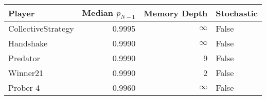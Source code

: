 \begin{tabular}{lrrl}
\toprule
             Player &  Median $p_{N-1}$ &  Memory Depth & Stochastic \\
\midrule
 CollectiveStrategy &            0.9995 &            \(\infty\) &      False \\
          Handshake &            0.9990 &            \(\infty\) &      False \\
           Predator &            0.9990 &             9 &      False \\
           Winner21 &            0.9990 &             2 &      False \\
           Prober 4 &            0.9960 &            \(\infty\) &      False \\
\bottomrule
\end{tabular}
